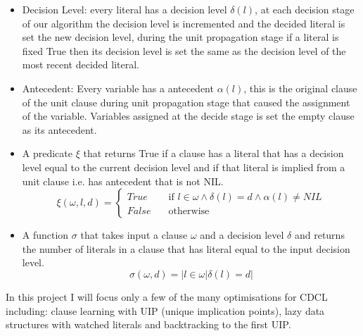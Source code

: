 \documentclass[12pt,a4paper]{article}
\begin{document}
\begin{itemize}
\item{
Decision Level: every literal has a decision level $\delta(l)$, at each decision stage of our algorithm the decision level is incremented and the decided literal is set the new decision level, during the unit propagation stage if a literal is fixed True then its decision level is set the same as the decision level of the most recent decided literal.}
\item{
Antecedent: Every variable has a antecedent $\alpha(l)$, this is the original clause of the unit clause during unit propagation stage that caused the assignment of the variable. Variables assigned at the decide stage is set the empty clause as its antecedent.}
\item{
A predicate $\xi$ that returns True if a clause has a literal that has a decision level equal to the current decision level and if that literal is implied from a unit clause i.e. has antecedent that is not NIL.
\[ \xi(\omega, l, d) =
  \begin{cases}
    True & \quad \text{if } l \in \omega \land \delta(l) = d \land \alpha(l) \neq  NIL\\
    False & \quad \text{otherwise }
  \end{cases}
\]

}
\item{
A function $\sigma$ that takes input a clause $\omega$ and a decision level $\delta$ and returns the number of literals in a clause that has literal equal to the input decision level.
\[\sigma(\omega, d) = |{l \in \omega | \delta(l) = d }| 
\]
}
\end{itemize}
In this project I will focus only a few of the many optimisations for CDCL including: clause learning with UIP (unique implication points), lazy data structures with watched literals and backtracking to the first UIP.
\end{document}
